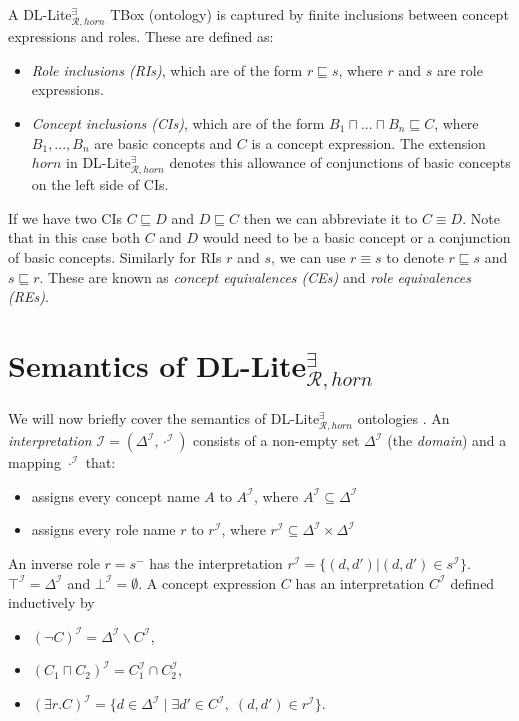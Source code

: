 A DL-Lite$_{\mathcal{R}, horn}^{\exists}$ TBox (ontology) is captured by finite inclusions between concept expressions and roles. These are defined as: 
\begin{itemize}
    \setlength\itemsep{1em}
    \item \emph{Role inclusions (RIs)}, which are of the form $r\sqsubseteq s$, where $r$ and $s$ are role expressions.
    \item \emph{Concept inclusions (CIs)}, which are of the form $B_1 \sqcap ... \sqcap B_n \sqsubseteq C$, where $B_1, ..., B_n$ are basic concepts and $C$ is a concept expression. The extension $horn$ in DL-Lite$_{\mathcal{R}, horn}^{\exists}$ denotes this allowance of conjunctions of basic concepts on the left side of CIs.
\end{itemize}

If we have two CIs $C\sqsubseteq D$ and $D \sqsubseteq C$ then we can abbreviate it to $C \equiv D$. Note that in this case both $C$ and $D$ would need to be a basic concept or a conjunction of basic concepts. Similarly for RIs $r$ and $s$, we can use $r\equiv s$ to denote $r\sqsubseteq s$ and $s \sqsubseteq r$. These are known as \emph{concept equivalences (CEs)} and \emph{role equivalences (REs)}.

\section{Semantics of DL-Lite$_{\mathcal{R}, horn}^{\exists}$}
We will now briefly cover the semantics of DL-Lite$_{\mathcal{R}, horn}^{\exists}$ ontologies \cite{baader_horrocks_lutz_sattler_2017}. An \emph{interpretation} $\mathcal{I} = (\Delta^{\mathcal{I}}, \cdot^{\mathcal{I}})$ consists of a non-empty set $\Delta^{\mathcal{I}}$ (the \emph{domain}) and a mapping $\cdot^{\mathcal{I}}$ that:
\begin{itemize}
    \item assigns every concept name $A$ to $A^{\mathcal{I}}$, where $A^{\mathcal{I}}\subseteq \Delta^{\mathcal{I}}$
    \item assigns every role name $r$ to  $r^{\mathcal{I}}$, where $r^{\mathcal{I}}\subseteq \Delta^{\mathcal{I}}\times \Delta^{\mathcal{I}}$
\end{itemize}
An inverse role $r = s^-$ has the interpretation $r^{\mathcal{I}}=\{(d, d') | (d,d')\in s^{\mathcal{I}}\}$. $ \top^{\mathcal{I}} = \Delta^{\mathcal{I}} $ and $ \bot^{\mathcal{I}} = \emptyset $. A concept expression $C$ has an interpretation $C^{\mathcal{I}}$ defined inductively by
\begin{itemize}
    \item $(\neg C)^{\mathcal{I}} = \Delta^{\mathcal{I}} \backslash C^{\mathcal{I}} $,
    \item $ (C_{1} \sqcap C_{2})^{\mathcal{I}} = C_{1}^{\mathcal{I}} \cap C_{2}^{\mathcal{I}} $,
    \item $ (\exists r.C)^{\mathcal{I}} = \{d\in \Delta ^{\mathcal{I}}\;|\; \exists d' \in C^{\mathcal{I}}, \; (d,d')\in r^{\mathcal{I}}\} $.
\end{itemize}

